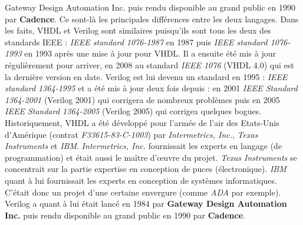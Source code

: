 {Gateway Design Automation Inc.}  puis rendu disponible au grand public en 1990 par \textbf{Cadence}.
Ce sont-là les principales différences entre les deux langages. Dans les faits, VHDL et Verilog sont similaires puisqu'ils sont tous les deux des standards IEEE : \textit{IEEE standard 1076-1987} 
\cite{IEEE_VHDL_87}
en 1987 puis \textit{IEEE standard 1076-1993}
\cite{IEEE_VHDL_93}
 en 1993 après une mise à jour pour VHDL. Il a ensuite été mis à jour régulièrement pour arriver, en 2008 au standard \textit{IEEE 1076}
\cite{IEEE_VHDL}
 (VHDL 4.0) qui est la dernière version en date. Verilog est lui devenu un standard en 1995 : \textit{IEEE standard 1364-1995} 
\cite{IEEE_VERILOG_1995}
et a été mis à jour deux fois depuis : en 2001  \textit{IEEE Standard 1364-2001} 
\cite{IEEE_VERILOG_2001}
(Verilog 2001) qui corrigera de nombreux problèmes puis en 2005  \textit{IEEE Standard 1364-2005}
\cite{IEEE_VERILOG_2005}
(Verilog 2005) qui corrigea quelques bogues. Historiquement, VHDL a été développé pour l'armée de l'air des Etats-Unis d'Amérique (contrat \textit{F33615-83-C-1003}) par \textit{Intermetrics, Inc.}, \textit{Texas Instruments} et \textit{IBM}. \textit{Intermetrics, Inc.}  fournissait les experts en langage (de programmation) et était aussi le maître d'\oe{}uvre du projet. \textit{Texas Instruments} se concentrait sur la partie expertise en conception de puces (électronique). \textit{IBM} quant à lui fournissait les experts en conception de systèmes informatiques. C'était donc un projet d'une certaine envergure (comme \textit{ADA} par exemple). Verilog a quant à lui était lancé en 1984 par \textbf{Gateway Design Automation Inc.}  puis rendu disponible au grand public en 1990 par \textbf{Cadence}.


